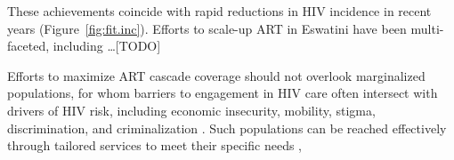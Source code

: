 These achievements coincide with rapid reductions in HIV incidence in recent years
\cite{SHIMS1,SHIMS2,SHIMS3} (Figure~\ref{fig:fit.inc}).
Efforts to scale-up ART in Eswatini have been multi-faceted, including \dots [TODO]
\par
Efforts to maximize ART cascade coverage should not overlook marginalized populations,
for whom barriers to engagement in HIV care often intersect with drivers of HIV risk,
including economic insecurity, mobility, stigma, discrimination, and criminalization
\cite{Wanyenze2016,Schwartz2017,Schmidt-Sane2022,Camlin2019,Baral2019}.
Such populations can be reached effectively through
tailored services to meet their specific needs \cite{Ehrenkranz2019},
